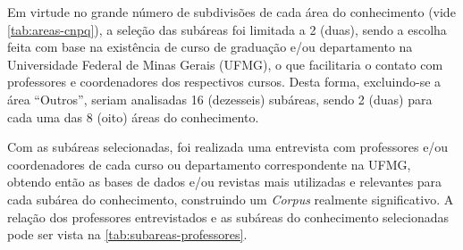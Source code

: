 Em virtude no grande número de subdivisões de cada área do conhecimento (vide \autoref{tab:areas-cnpq}), a seleção das subáreas foi limitada a 2 (duas), sendo a escolha feita com base na existência de curso de graduação e/ou departamento na Universidade Federal de Minas Gerais (UFMG), o que facilitaria o contato com professores e coordenadores dos respectivos cursos. Desta forma, excluindo-se a área ``Outros'', seriam analisadas 16 (dezesseis) subáreas, sendo 2 (duas) para cada uma das 8 (oito) áreas do conhecimento.

Com as subáreas selecionadas, foi realizada uma entrevista com professores e/ou coordenadores de cada curso ou departamento correspondente na UFMG, obtendo então as bases de dados e/ou revistas mais utilizadas e relevantes para cada subárea do conhecimento, construindo um \emph{Corpus} realmente significativo. A relação dos professores entrevistados e as subáreas do conhecimento selecionadas pode ser vista na \autoref{tab:subareas-professores}.

